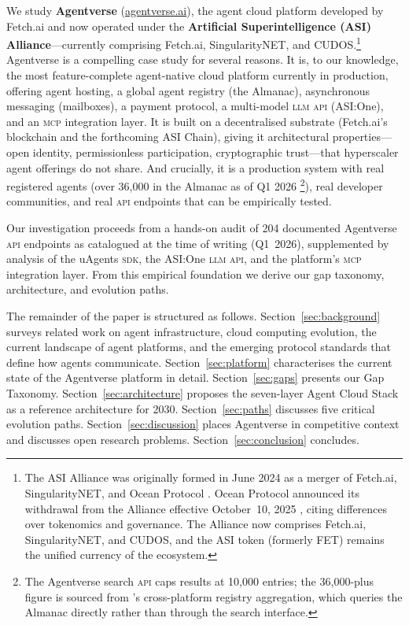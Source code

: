\documentclass[twoside,11pt]{article}
\begin{document}
We study \textbf{Agentverse} (\url{agentverse.ai}), the agent cloud platform
developed by Fetch.ai and now operated under the \textbf{Artificial
Superintelligence (ASI) Alliance}---currently comprising Fetch.ai,
SingularityNET, and CUDOS.\footnote{%
  The ASI Alliance was originally formed in June 2024 as a merger of Fetch.ai,
  SingularityNET, and Ocean Protocol \citep{asialliance2024merger}.  Ocean
  Protocol announced its withdrawal from the Alliance effective October~10,
  2025 \citep{ocean2025withdrawal}, citing differences over tokenomics and
  governance.  The Alliance now comprises Fetch.ai, SingularityNET, and CUDOS,
  and the ASI token (formerly FET) remains the unified currency of the
  ecosystem.}
Agentverse is a compelling case study for several reasons.  It is, to our
knowledge, the most feature-complete agent-native cloud platform currently in
production, offering agent hosting, a global agent registry (the Almanac),
asynchronous messaging (mailboxes), a payment protocol, a multi-model
\textsc{llm} \textsc{api} (ASI:One), and an \textsc{mcp} integration layer.
It is built on a decentralised substrate (Fetch.ai's blockchain and the
forthcoming ASI Chain), giving it architectural properties---open identity,
permissionless participation, cryptographic trust---that hyperscaler agent
offerings \citep{aws2025bedrock,microsoft2025entra,google2026next} do not
share.  And crucially, it is a production system with real registered agents
(over 36,000 in the Almanac as of Q1 2026
\citep{kantor2026stateofagents}\footnote{The Agentverse search \textsc{api}
caps results at 10,000 entries; the 36,000-plus figure is sourced from
\citeauthor{kantor2026stateofagents}'s cross-platform registry aggregation,
which queries the Almanac directly rather than through the search interface.}),
real developer communities, and real \textsc{api} endpoints that can be
empirically tested.

Our investigation proceeds from a hands-on audit of 204 documented
Agentverse \textsc{api} endpoints as catalogued at the time of writing
(Q1~2026), supplemented by analysis of the uAgents \textsc{sdk}, the
ASI:One \textsc{llm} \textsc{api}, and the platform's \textsc{mcp}
integration layer.  From this empirical foundation we derive our gap
taxonomy, architecture, and evolution paths.

The remainder of the paper is structured as follows.
Section~\ref{sec:background} surveys related work on agent infrastructure,
cloud computing evolution, the current landscape of agent platforms, and the
emerging protocol standards that define how agents communicate.
Section~\ref{sec:platform} characterises the current state of the Agentverse
platform in detail.  Section~\ref{sec:gaps} presents our Gap Taxonomy.
Section~\ref{sec:architecture} proposes the seven-layer Agent Cloud Stack as a
reference architecture for 2030.  Section~\ref{sec:paths} discusses five
critical evolution paths.  Section~\ref{sec:discussion} places Agentverse in
competitive context and discusses open research problems.
Section~\ref{sec:conclusion} concludes.
\end{document}
